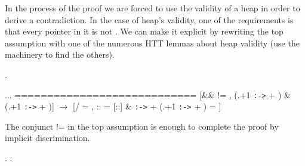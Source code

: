 \coqdocemptyline


In the process of the proof we are forced to use the validity of a
heap in order to derive a contradiction. In the case of heap's
validity, one of the requirements is that every pointer in it is not
. We can make it explicit by rewriting the top assumption with
one of the numerous HTT lemmas about heap validity (use the 
machinery to find the others).




\begin{coqdoccode}
\coqdocemptyline
\coqdocnoindent
{} .\coqdoceol
\end{coqdoccode}
\coqdoceol
\coqdocemptyline
\coqdocindent{1.00em}
...\coqdoceol
\coqdocindent{1.00em}
============================\coqdoceol
\coqdocindent{1.50em}
[\&\&  != ,  (.+1 \texttt{:->}  + )\coqdoceol
\coqdocindent{2.50em}
\&    (.+1 \texttt{:->}  + )] \ensuremath{\rightarrow}\coqdoceol
\coqdocindent{1.50em}
[/  = ,  ::  = [::] \&  \texttt{:->}  + (.+1 \texttt{:->}  + ) = ]

\coqdocemptyline


The conjunct  !=  in the top assumption is enough to
complete the proof by implicit discrimination.


\begin{coqdoccode}
\coqdocemptyline
\coqdocnoindent
{}.\coqdoceol
\coqdocnoindent
{}.\coqdoceol
\coqdocemptyline
\end{coqdoccode}


